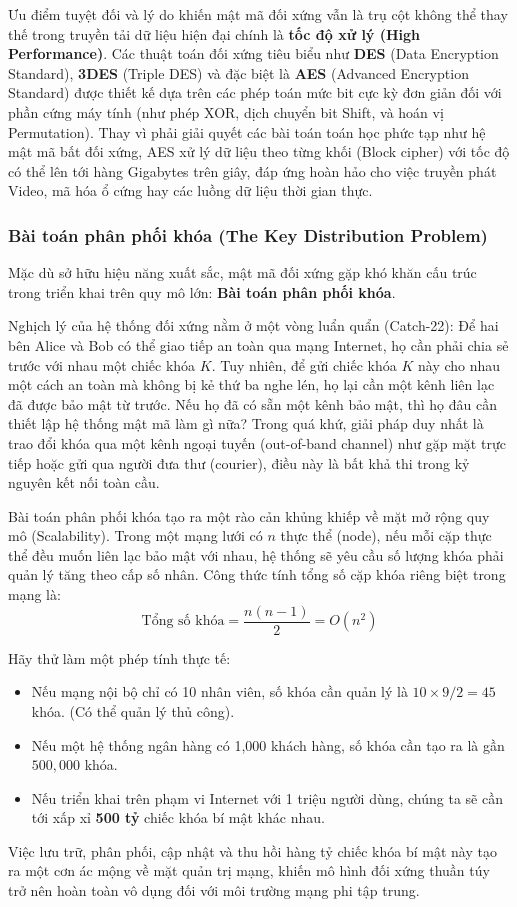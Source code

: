 Ưu điểm tuyệt đối và lý do khiến mật mã đối xứng vẫn là trụ cột không thể thay thế trong truyền tải dữ liệu hiện đại chính là \textbf{tốc độ xử lý (High Performance)}. Các thuật toán đối xứng tiêu biểu như \textbf{DES} (Data Encryption Standard), \textbf{3DES} (Triple DES) và đặc biệt là \textbf{AES} (Advanced Encryption Standard) được thiết kế dựa trên các phép toán mức bit cực kỳ đơn giản đối với phần cứng máy tính (như phép XOR, dịch chuyển bit Shift, và hoán vị Permutation). Thay vì phải giải quyết các bài toán toán học phức tạp như hệ mật mã bất đối xứng, AES xử lý dữ liệu theo từng khối (Block cipher) với tốc độ có thể lên tới hàng Gigabytes trên giây, đáp ứng hoàn hảo cho việc truyền phát Video, mã hóa ổ cứng hay các luồng dữ liệu thời gian thực.

\subsubsection*{Bài toán phân phối khóa (The Key Distribution Problem)}

Mặc dù sở hữu hiệu năng xuất sắc, mật mã đối xứng gặp khó khăn cấu trúc trong triển khai trên quy mô lớn: \textbf{Bài toán phân phối khóa}.

Nghịch lý của hệ thống đối xứng nằm ở một vòng luẩn quẩn (Catch-22): Để hai bên Alice và Bob có thể giao tiếp an toàn qua mạng Internet, họ cần phải chia sẻ trước với nhau một chiếc khóa $K$. Tuy nhiên, để gửi chiếc khóa $K$ này cho nhau một cách an toàn mà không bị kẻ thứ ba nghe lén, họ lại cần một kênh liên lạc đã được bảo mật từ trước. Nếu họ đã có sẵn một kênh bảo mật, thì họ đâu cần thiết lập hệ thống mật mã làm gì nữa? Trong quá khứ, giải pháp duy nhất là trao đổi khóa qua một kênh ngoại tuyến (out-of-band channel) như gặp mặt trực tiếp hoặc gửi qua người đưa thư (courier), điều này là bất khả thi trong kỷ nguyên kết nối toàn cầu.

Bài toán phân phối khóa tạo ra một rào cản khủng khiếp về mặt mở rộng quy mô (Scalability). Trong một mạng lưới có $n$ thực thể (node), nếu mỗi cặp thực thể đều muốn liên lạc bảo mật với nhau, hệ thống sẽ yêu cầu số lượng khóa phải quản lý tăng theo cấp số nhân. Công thức tính tổng số cặp khóa riêng biệt trong mạng là:
$$ \text{Tổng số khóa} = \frac{n(n-1)}{2} = O(n^2) $$

Hãy thử làm một phép tính thực tế:
\begin{itemize}
    \item Nếu mạng nội bộ chỉ có 10 nhân viên, số khóa cần quản lý là $10 \times 9 / 2 = 45$ khóa. (Có thể quản lý thủ công).
    \item Nếu một hệ thống ngân hàng có 1,000 khách hàng, số khóa cần tạo ra là gần $500,000$ khóa.
    \item Nếu triển khai trên phạm vi Internet với 1 triệu người dùng, chúng ta sẽ cần tới xấp xỉ \textbf{500 tỷ} chiếc khóa bí mật khác nhau.
\end{itemize}
Việc lưu trữ, phân phối, cập nhật và thu hồi hàng tỷ chiếc khóa bí mật này tạo ra một cơn ác mộng về mặt quản trị mạng, khiến mô hình đối xứng thuần túy trở nên hoàn toàn vô dụng đối với môi trường mạng phi tập trung.

